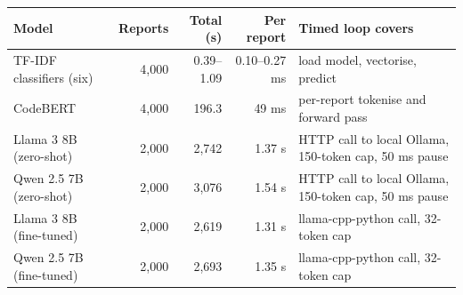 \begin{tabular*}{\tblwidth}{@{\extracolsep{\fill}} lrrr>{\raggedright\arraybackslash}p{4.6cm} @{}}
\toprule
Model & Reports & Total (s) & Per report & Timed loop covers \\
\midrule
TF-IDF classifiers (six) & 4,000 & 0.39--1.09 & 0.10--0.27 ms & load model, vectorise, predict \\
CodeBERT & 4,000 & 196.3 & 49 ms & per-report tokenise and forward pass \\
Llama 3 8B (zero-shot) & 2,000 & 2,742 & 1.37 s & HTTP call to local Ollama, 150-token cap, 50 ms pause \\
Qwen 2.5 7B (zero-shot) & 2,000 & 3,076 & 1.54 s & HTTP call to local Ollama, 150-token cap, 50 ms pause \\
Llama 3 8B (fine-tuned) & 2,000 & 2,619 & 1.31 s & llama-cpp-python call, 32-token cap \\
Qwen 2.5 7B (fine-tuned) & 2,000 & 2,693 & 1.35 s & llama-cpp-python call, 32-token cap \\
\bottomrule
\end{tabular*}
